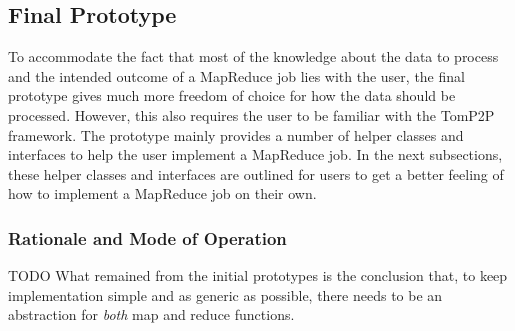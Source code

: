 \subsection{Final Prototype}
To accommodate the fact that most of the knowledge about the data to process and the intended outcome of a MapReduce job lies with the user, the final prototype gives much more freedom of choice for how the data should be processed. However, this also requires the user to be familiar with the TomP2P framework. The prototype mainly provides a number of helper classes and interfaces to help the user implement a MapReduce job. In the next subsections, these helper classes and interfaces are outlined for users to get a better feeling of how to implement a MapReduce job on their own.

\subsubsection{Rationale and Mode of Operation}
TODO\newline
What remained from the initial prototypes is the conclusion that, to keep implementation simple and as generic as possible, there needs to be an abstraction for \textit{both} map and reduce functions.
\newline
